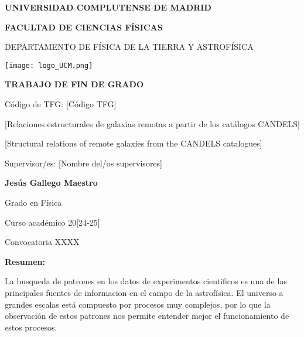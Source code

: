 \documentclass[11pt, a4paper]{article} %
\begin{document}
\begin{titlepage}
\centering
{ \bfseries \Large UNIVERSIDAD COMPLUTENSE DE MADRID}
\vspace{0.5cm}

{\bfseries  \Large FACULTAD DE CIENCIAS FÍSICAS} 
\vspace{1cm}

{\large DEPARTAMENTO DE FÍSICA DE LA TIERRA Y ASTROFÍSICA}
\vspace{0.8cm}

{\texttt{[image: logo\_UCM.png]}} %
\vspace{0.8cm}

{\bfseries \Large TRABAJO DE FIN DE GRADO}
\vspace{2cm}

{\Large Código de TFG:  [C\'odigo TFG] } \vspace{5mm}

{\Large [Relaciones estructurales de galaxias remotas a partir de los catálogos CANDELS]}\vspace{5mm}

{\Large [Structural relations of remote galaxies from the CANDELS catalogues]}\vspace{5mm}

{\Large Supervisor/es: [Nombre del/os supervisores]}\vspace{20mm} 

{\bfseries \LARGE Jesús Gallego Maestro}\vspace{5mm} 

{\large Grado en Física}\vspace{5mm} 

{\large Curso acad\'emico 20[24-25]}\vspace{5mm} 

{\large Convocatoria XXXX}\vspace{5mm} 

\end{titlepage}
\newpage


{\bfseries \large Resumen:} \vspace{5mm}

La busqueda de patrones en los datos de experimentos cientificos es una de las principales
fuentes de informacion en el campo de la astrofísica. El universo a grandes escalas está 
compuesto por procesos muy complejos, por lo que la
observación de estos patrones nos permite entender mejor el funcionamiento de estos procesos.
\end{document}
